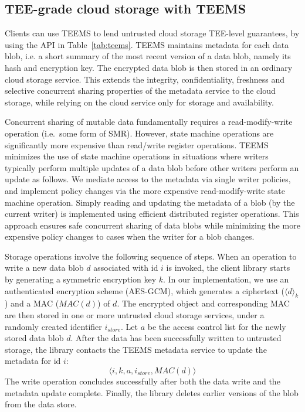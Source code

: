 \subsection{\ac{TEE}-grade cloud storage with \ac{TEEMS}}

Clients can use \ac{TEEMS} to lend untrusted cloud storage \ac{TEE}-level
guarantees, by using the API in Table~\ref{tab:teems}.
\ac{TEEMS} maintains metadata for each data blob, i.e. a short summary of
the most recent version of a data blob, namely its hash and encryption
key. The encrypted data blob is then stored in an ordinary cloud
storage service. This extends the integrity, confidentiality,
freshness and selective concurrent sharing properties of the
metadata service to the cloud storage, while relying on the cloud
service only for storage and availability.

Concurrent sharing of mutable data fundamentally requires a
read-modify-write operation (i.e.\ some form of SMR). However, state machine operations are significantly
more expensive than read/write register operations. \ac{TEEMS}
minimizes the use of state machine operations in situations where
writers typically perform multiple updates of a data blob before
other writers perform an update as follows.  We mediate access to
the metadata via single writer policies, and implement policy
changes via the more expensive read-modify-write state machine operation.
Simply reading and updating the metadata of a blob (by the
current writer) is implemented using efficient distributed
register operations.  This approach ensures safe concurrent
sharing of data blobs while minimizing the more expensive policy
changes to cases when the writer for a blob changes.

Storage operations involve the following sequence of steps.  When an
operation to write a new data blob $d$ associated with id $i$ is
invoked, the client library starts by generating a symmetric
encryption key $k$. In our implementation, we use an authenticated
encryption scheme (AES-GCM), which generates a ciphertext ($\langle d
\rangle_k$) and a MAC ($MAC(d)$) of $d$.
%
The encrypted object and corresponding MAC are then stored in one
or more untrusted cloud storage services, under a randomly
created identifier $i_{store}$. Let $a$ be the access control
list for the newly stored data blob $d$. After the data has been
successfully written to untrusted storage, the library contacts
the \ac{TEEMS} metadata service to update the metadata for id $i$:
\[ \langle i,k,a,i_{store},MAC(d) \rangle   \]
%
The write operation concludes successfully after both the data
write and the metadata update complete. Finally, the library
deletes earlier versions of the blob from the data store.


